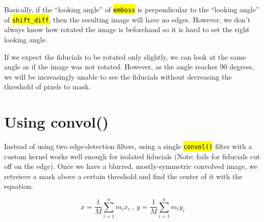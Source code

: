 \documentclass[10pt]{scrartcl}
\begin{document}

    Basically, if the ``looking angle'' of \hl{\texttt{emboss}} is perpendicular to the ``looking angle'' of \hl{\texttt{shift\_diff}}, then the resulting image will have no edges. However, we don't always know how rotated the image is beforehand so it is hard to set the right looking angle. 


    If we expect the fiducials to be rotated only slightly, we can look at the same angle as if the image was not rotated. However, as the angle reaches 90 degrees, we will be increasingly unable to see the fiducials without decreasing the threshold of pixels to mask.


\section{Using convol()} %
\label{sec:using_convol}
    Instead of using two edge-detection filters, using a single \hl{\texttt{convol()}} filter with a custom kernel works well enough for isolated fiducials (Note: fails for fiducials cut off on the edge). Once we have a blurred, mostly-symmetric convolved image, we retreieve a mask above a certain threshold and find the center of it with the equation:

    \begin{equation}
        x = \frac{1}{M}\sum_{i=1}^{n}m_ix_i~,~y = \frac{1}{M}\sum_{i=1}^{n}m_iy_i
    \end{equation}
\end{document}
